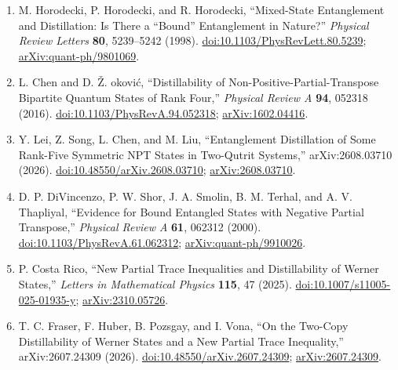 \begin{enumerate}[label={},leftmargin=4.8em,labelsep=0.5em]
  \footnotesize
  \item[\textup{[HHH98]}]\label{ref:p10-horodecki}
  M. Horodecki, P. Horodecki, and R. Horodecki,
  ``Mixed-State Entanglement and Distillation: Is There a ``Bound''
  Entanglement in Nature?''
  \emph{Physical Review Letters} \textbf{80}, 5239--5242 (1998).
  \href{https://doi.org/10.1103/PhysRevLett.80.5239}%
       {doi:10.1103/PhysRevLett.80.5239};
  \href{https://arxiv.org/abs/quant-ph/9801069}%
       {arXiv:quant-ph/9801069}.

  \item[\textup{[CD16]}]\label{ref:p10-chen-djokovic}
  L. Chen and D. \v{Z}. \DJ okovi\'c,
  ``Distillability of Non-Positive-Partial-Transpose Bipartite Quantum States
  of Rank Four,'' \emph{Physical Review A} \textbf{94}, 052318 (2016).
  \href{https://doi.org/10.1103/PhysRevA.94.052318}%
       {doi:10.1103/PhysRevA.94.052318};
  \href{https://arxiv.org/abs/1602.04416}{arXiv:1602.04416}.

  \item[\textup{[LSC+26]}]\label{ref:p10-lei-et-al}
  Y. Lei, Z. Song, L. Chen, and M. Liu,
  ``Entanglement Distillation of Some Rank-Five Symmetric NPT States in
  Two-Qutrit Systems,'' arXiv:2608.03710 (2026).
  \href{https://doi.org/10.48550/arXiv.2608.03710}%
       {doi:10.48550/arXiv.2608.03710};
  \href{https://arxiv.org/abs/2608.03710}{arXiv:2608.03710}.

  \item[\textup{[DSS+00]}]\label{ref:p10-divincenzo-et-al}
  D. P. DiVincenzo, P. W. Shor, J. A. Smolin, B. M. Terhal, and
  A. V. Thapliyal,
  ``Evidence for Bound Entangled States with Negative Partial Transpose,''
  \emph{Physical Review A} \textbf{61}, 062312 (2000).
  \href{https://doi.org/10.1103/PhysRevA.61.062312}%
       {doi:10.1103/PhysRevA.61.062312};
  \href{https://arxiv.org/abs/quant-ph/9910026}%
       {arXiv:quant-ph/9910026}.

  \item[\textup{[CR25]}]\label{ref:p10-costa-rico}
  P. Costa Rico,
  ``New Partial Trace Inequalities and Distillability of Werner States,''
  \emph{Letters in Mathematical Physics} \textbf{115}, 47 (2025).
  \href{https://doi.org/10.1007/s11005-025-01935-y}%
       {doi:10.1007/s11005-025-01935-y};
  \href{https://arxiv.org/abs/2310.05726}{arXiv:2310.05726}.

  \item[\textup{[FHPV26]}]\label{ref:p10-fraser-et-al}
  T. C. Fraser, F. Huber, B. Pozsgay, and I. Vona,
  ``On the Two-Copy Distillability of Werner States and a New Partial Trace
  Inequality,'' arXiv:2607.24309 (2026).
  \href{https://doi.org/10.48550/arXiv.2607.24309}%
       {doi:10.48550/arXiv.2607.24309};
  \href{https://arxiv.org/abs/2607.24309}{arXiv:2607.24309}.


\end{enumerate}
